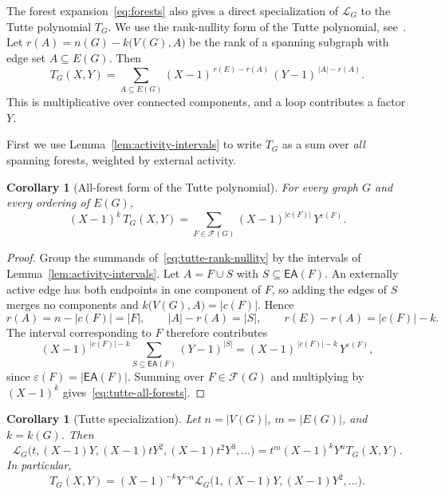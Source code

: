\documentclass[11pt]{article}
\theoremstyle{plain}
\newtheorem{corollary}[theorem]{Corollary}
\theoremstyle{definition}
\renewcommand{\mathcal}{\mathscr}
\newcommand{\LL}{\mathcal{L}}    %
\newcommand{\cF}{\mathcal{F}}    %
\newcommand{\EA}{\mathsf{EA}} %
\newcommand{\eps}{\varepsilon}
\numberwithin{equation}{section}
\begin{document}
The forest expansion~\eqref{eq:forests} also gives a direct specialization of $\LL_G$ to the Tutte polynomial $T_G$.
%
We use the rank-nullity form of the Tutte polynomial,  see~\cite{Tu2,EM}. Let
$r(A)=n(G)-k\bigl(V(G),A\bigr)$ be the rank of a
spanning subgraph with edge set $A\subseteq E(G)$.
Then
\begin{equation}\label{eq:tutte-rank-nullity}
  T_G(X,Y)  =   \sum_{A\subseteq E(G)}
  (X-1)^{\,r(E)-r(A)}\,(Y-1)^{\,|A|-r(A)} .
\end{equation}
This is multiplicative over connected components, and a loop contributes a factor $Y$.


First we use Lemma~\ref{lem:activity-intervals} to write $T_G$ as a sum over \emph{all} spanning forests, weighted by external activity.

\begin{corollary}[All-forest form of the Tutte polynomial]
\label{cor:tutte-all-forests}
For every graph $G$ and every ordering of $E(G)$,
\begin{equation}\label{eq:tutte-all-forests}
   (X-1)^{k}\,T_G(X,Y)
   =
   \sum_{F\in\cF(G)}(X-1)^{|c(F)|}\,Y^{\eps(F)} .
\end{equation}
\end{corollary}

\begin{proof}
  Group the summands of~\eqref{eq:tutte-rank-nullity} by the intervals of Lemma~\ref{lem:activity-intervals}.
 Let $A=F\cup S$ with $S\subseteq\EA(F)$.  An externally active edge has both endpoints in one
component of $F$, so adding the edges of $S$ merges no components and $k\bigl(V(G),A\bigr)=|c(F)|$.  Hence
\[
   r(A)=n-|c(F)|=|F|,  \qquad  |A|-r(A)=|S|,
   \qquad    r(E)-r(A)=|c(F)|-k .
\]
The interval corresponding to $F$ therefore contributes
\[
(X-1)^{\,|c(F)|-k} \sum_{S\subseteq\EA(F)}(Y-1)^{|S|}
 =(X-1)^{\,|c(F)|-k}\,Y^{\eps(F)},
\]
since $\eps(F)=|\EA(F)|$.  Summing over $F\in\cF(G)$ and multiplying by~$(X-1)^{k}$  gives~\eqref{eq:tutte-all-forests}.
\end{proof}


\begin{corollary}[Tutte specialization]\label{cor:tutte-specialization}
Let $n=|V(G)|$, $m=|E(G)|$, and $k=k(G)$.  Then
\begin{equation}\label{eq:tutte-specialization}
\LL_G\bigl(  t,(X-1)Y,(X-1)tY^2,(X-1)t^2Y^3,\ldots \bigr)
= t^m(X-1)^kY^nT_G(X,Y).
\end{equation}
In particular,
\begin{equation}\label{eq:tutte-specialization-t1}
T_G(X,Y) = (X-1)^{-k}Y^{-n}
\LL_G\bigl(1,(X-1)Y,(X-1)Y^2,\ldots\bigr).
\end{equation}
\end{corollary}
\end{document}
